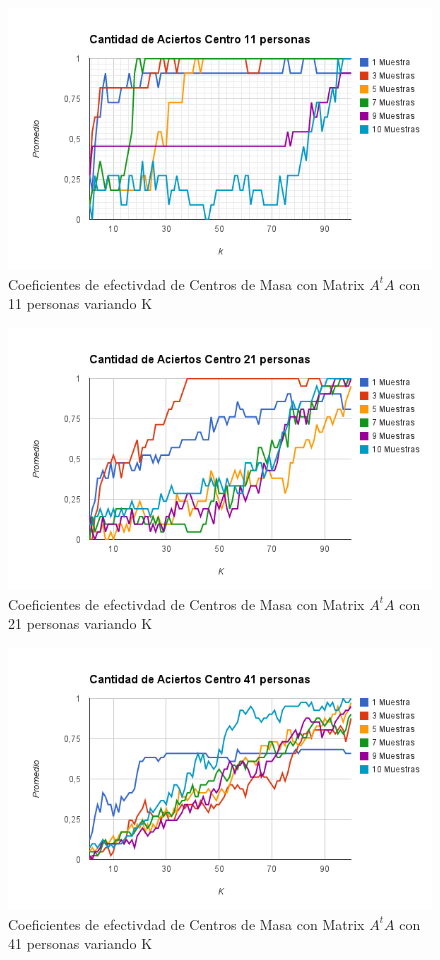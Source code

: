 \begin{figure}[H] \includegraphics[width=1\textwidth]{img/image13.png} \caption{Coeficientes de
    efectivdad de Centros de Masa con Matrix $A^tA$ con 11 personas variando K} \end{figure}

\begin{figure}[H] \includegraphics[width=1\textwidth]{img/image14.png} \caption{Coeficientes de
    efectivdad de Centros de Masa con Matrix $A^tA$ con 21 personas variando K} \end{figure}

\begin{figure}[H] \includegraphics[width=1\textwidth]{img/image15.png} \caption{Coeficientes de
    efectivdad de Centros de Masa con Matrix $A^tA$ con 41 personas variando K} \end{figure}

